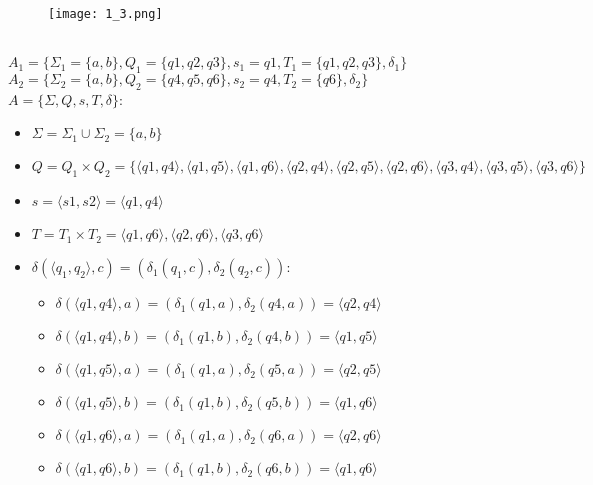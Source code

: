 \documentclass[12pt, a4paper]{article}
\begin{document}
\begin{enumerate}
\begin{comment}
digraph {
    rankdir="LR"
    "" [shape=point]
    q4 [shape=circle]
    q5 [shape=circle]
    q6 [shape=doublecircle]
    
    "" -> q4
    q4 -> q4 [label="a"]
    q4 -> q5 [label="b"]
    q5 -> q5 [label="a"]
    q5 -> q6 [label="b"]
    q6 -> q6 [label="a,b"]
}
\end{comment}

    \begin{figure}[H]
        \centering
        \texttt{[image: 1\_3.png]}
    \end{figure}
    
\\\(A_1=\{\Sigma_1=\{a,b\}, Q_1=\{q1,q2,q3\}, s_1=q1, T_1=\{q1,q2,q3\}, \delta_1\} \)
\\\(A_2=\{\Sigma_2=\{a,b\}, Q_2=\{q4,q5,q6\}, s_2=q4, T_2=\{q6\}, \delta_2\} \)
\\\(A=\{\Sigma, Q, s, T, \delta\} \):
\begin{itemize}
    \item \(\Sigma=\Sigma_1 \cup \Sigma_2=\{a,b\} \)
    \item \(Q=Q_1 \times Q_2=\{\langle q1,q4 \rangle, \langle q1,q5 \rangle, \langle q1,q6 \rangle, \langle q2,q4 \rangle, \langle q2,q5 \rangle, \langle q2,q6 \rangle, \langle q3,q4 \rangle, \langle q3,q5 \rangle, \langle q3,q6 \rangle\}\)
    \item \(s=\langle s1,s2 \rangle = \langle q1,q4 \rangle\)
    \item \(T=T_1 \times T_2=\langle q1,q6 \rangle, \langle q2,q6 \rangle, \langle q3,q6 \rangle\)
    \item \(\delta(\langle q_1,q_2 \rangle,c)=(\delta_1(q_1,c),\delta_2(q_2,c))\):
    \begin{itemize}
        \item \(\delta(\langle q1,q4 \rangle,a)=(\delta_1(q1,a),\delta_2(q4,a))=\langle q2,q4 \rangle\)
        \item \(\delta(\langle q1,q4 \rangle,b)=(\delta_1(q1,b),\delta_2(q4,b))=\langle q1,q5 \rangle\)
        \item \(\delta(\langle q1,q5 \rangle,a)=(\delta_1(q1,a),\delta_2(q5,a))=\langle q2,q5 \rangle\)
        \item \(\delta(\langle q1,q5 \rangle,b)=(\delta_1(q1,b),\delta_2(q5,b))=\langle q1,q6 \rangle\)
        \item \(\delta(\langle q1,q6 \rangle,a)=(\delta_1(q1,a),\delta_2(q6,a))=\langle q2,q6 \rangle\)
        \item \(\delta(\langle q1,q6 \rangle,b)=(\delta_1(q1,b),\delta_2(q6,b))=\langle q1,q6 \rangle\)
        

\end{itemize}
\end{itemize}
\end{enumerate}
\end{document}
